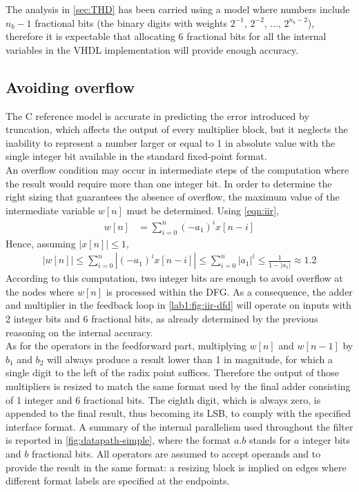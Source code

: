 The analysis in \autoref{sec:THD} has been carried using a model where numbers include $n_b-1$ fractional bits (the binary digits with weights $2^{-1}$, $2^{-2}$, ..., $2^{n_b-2}$), therefore it is expectable that allocating 6 fractional bits for all the internal variables in the VHDL implementation will provide enough accuracy.

\subsection{Avoiding overflow}
The C reference model is accurate in predicting the error introduced by truncation, which affects the output of every multiplier block, but it neglects the inability to represent a number larger or equal to 1 in absolute value with the single integer bit available in the standard fixed-point format.\\
An overflow condition may occur in intermediate steps of the computation where the result would require more than one integer bit. In order to determine the right sizing that guarantees the absence of overflow, the maximum value of the intermediate variable $w[n]$ must be determined. Using \autoref{eqn:iir},
\begin{align*}
	w[n] &= \sum_{i=0}^{n} (-a_1)^i x[n-i]
\end{align*}
Hence, assuming $|x[n]|\leq 1$,
\begin{align*}
	|w[n]|\leq
	\sum_{i=0}^{n} |(-a_1)^i x[n-i]| \leq
	\sum_{i=0}^{n} |a_1|^i \leq
	\frac{1}{1-|a_1|} \approx
	1.2
\end{align*}
According to this computation, two integer bits are enough to avoid overflow at the nodes where $w[n]$ is processed within the DFG. As a consequence, the adder and multiplier in the feedback loop in \autoref{lab1:fig:iir-dfd} will operate on inputs with 2 integer bits and 6 fractional bits, as already determined by the previous reasoning on the internal accuracy.\\
As for the operators in the feedforward part, multiplying $w[n]$ and $w[n-1]$ by $b_1$ and $b_2$ will always produce a result lower than 1 in magnitude, for which a single digit to the left of the radix point suffices. Therefore the output of those multipliers is resized to match the same format used by the final adder consisting of 1 integer and 6 fractional bits. The eighth digit, which is always zero, is appended to the final result, thus becoming its LSB, to comply with the specified interface format. A summary of the internal parallelism used throughout the filter is reported in \autoref{fig:datapath-simple}, where the format $a.b$ stands for $a$ integer bits and $b$ fractional bits. All operators are assumed to accept operands and to provide the result in the same format: a resizing block is implied on edges where different format labels are specified at the endpoints.
